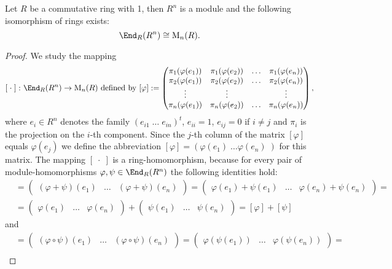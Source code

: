 \begin{prop}\label{prop.Matrix isomorph Homomorphism}
Let $R$ be a commutative ring with 1, then $R^n$ is a module and the following isomorphism of rings exists:
\begin{equation*}
\End_R(R^n)\cong \mathrm{M}_n(R).
\end{equation*}
\end{prop}
\begin{proof}
We study the mapping 
\begin{equation*}
\left[\;\cdot\;\right]\colon\End_R(R^n)\to\mathrm{M}_n(R)\text{ defined by }[\varphi]:=
\begin{pmatrix}
\pi_1(\varphi(e_1)) & \pi_1(\varphi(e_2)) & \ldots & \pi_1(\varphi(e_n))\\
\pi_2(\varphi(e_1)) & \pi_2(\varphi(e_2)) & \ldots & \pi_2(\varphi(e_n))\\
\vdots &\vdots & &\vdots\\
\pi_n(\varphi(e_1)) & \pi_n(\varphi(e_2)) & \ldots & \pi_n(\varphi(e_n))
\end{pmatrix},
\end{equation*}
where $e_i\in R^n$ denotes the family $\left(e_{i1}\;\ldots\;e_{in}\right)^t$, $e_{ii}=1$, $e_{ij}=0$ if $i\neq j$ and $\pi_i$ is the projection on the $i$-th component. Since the $j$-th column of the matrix $[\varphi]$ equals $\varphi(e_j)$ we define the abbreviation $[\varphi]=\left(\varphi(e_1)\;\ldots\varphi(e_n)\;\right)$ for this matrix. The mapping $\left[\;\cdot\;\right]$ is a ring-homomorphism, because for every pair of module-homomorphisms $\varphi,\psi\in\End_R(R^n)$ the following identities hold:
\begin{align*}
[\varphi+\psi]&=\begin{pmatrix}(\varphi+\psi)(e_1) & \dots & (\varphi+\psi)(e_n)\end{pmatrix}=\begin{pmatrix}\varphi(e_1)+\psi(e_1) & \dots & \varphi(e_n)+\psi(e_n)\end{pmatrix}=\\
&=\begin{pmatrix}\varphi(e_1) & \ldots & \varphi(e_n)\end{pmatrix}+\begin{pmatrix}\psi(e_1) & \ldots & \psi(e_n)\end{pmatrix}=[\varphi]+[\psi]
\end{align*}
and
\begin{align*}
[\varphi\circ\psi]&=\begin{pmatrix}(\varphi\circ\psi)(e_1) & \ldots & (\varphi\circ\psi)(e_n)\end{pmatrix}=\begin{pmatrix}\varphi(\psi(e_1)) & \ldots & \varphi(\psi(e_n))\end{pmatrix}=\\

\end{align*}
\end{proof}
